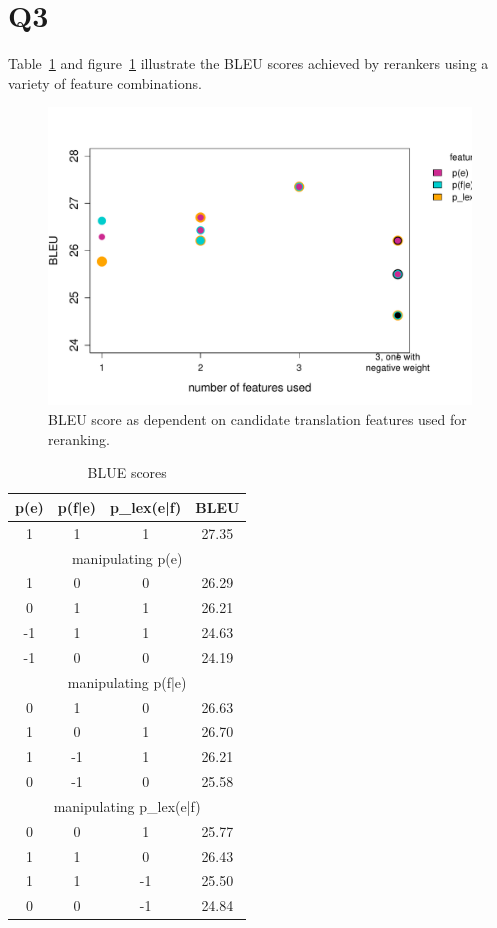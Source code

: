 \section*{Q3}
Table~\ref{BLEUtable} and figure~\ref{BLEU} illustrate the BLEU scores achieved by rerankers using a variety of feature combinations.

\begin{figure}
	\centering
	\includegraphics[scale=.65]{figures/q3.pdf}
	\caption{BLEU score as dependent on candidate translation features used for reranking.}\label{BLEU}
\end{figure}

\begin{table}
	\centering
	\begin{tabular}{||c|c|c|c||}
		\hline
		p(e) & p(f|e) & p\_lex(e|f) & BLEU\\
		\hline
		1&1&1&27.35\\
		\hline
		\multicolumn{4}{||c||}{manipulating p(e)}\\
		\hline
		1&0&0&26.29\\
		0&1&1&26.21\\
		-1&1&1&24.63\\
		-1&0&0&24.19\\
		\hline
		\multicolumn{4}{||c||}{manipulating p(f|e)}\\
		\hline
		0&1&0&26.63\\
		1&0&1&26.70\\
		1&-1&1&26.21\\
		0&-1&0&25.58\\
		\hline
		\multicolumn{4}{||c||}{manipulating p\_lex(e|f)}\\
		\hline
		0&0&1&25.77\\
		1&1&0&26.43\\
		1&1&-1&25.50\\
		0&0&-1&24.84\\
		\hline
		\end{tabular}
		\caption{BLUE scores}\label{BLEUtable}
\end{table}

